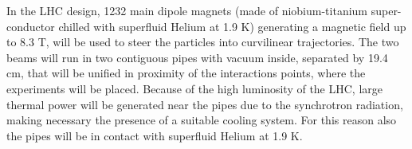 In the LHC design, 1232 main dipole magnets (made of niobium-titanium super-conductor chilled with superfluid Helium at 1.9 K) generating a magnetic field up to 8.3 T, will be used to steer the particles into curvilinear trajectories. The two beams will run in two contiguous pipes with vacuum inside, separated by 19.4 cm, that will be unified in proximity of the interactions points, where the experiments will be placed. Because of the high luminosity of the LHC, large thermal power will be generated near the pipes due to the synchrotron radiation, making necessary the presence of a suitable cooling system. For this reason also the pipes will be in contact with superfluid Helium at 1.9 K. \\
